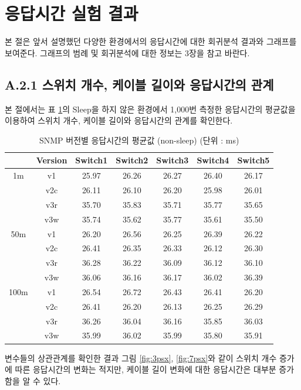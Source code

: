 \documentclass[11pt
  , a4paper
  , article
  , oneside
]{memoir}
\begin{document}
\clearpage
\section{응답시간 실험 결과}
본 절은 앞서 설명했던 다양한 환경에서의 응답시간에 대한 회귀분석 결과와 그래프를 보여준다. 그래프의 범례 및 회귀분석에 대한 정보는 3장을 참고 바란다.

\subsection{A.2.1 스위치 개수, 케이블 길이와 응답시간의 관계}


본 절에서는 표 \ref{table:sx}의 Sleep을 하지 않은 환경에서 1,000번 측정한 응답시간의 평균값을 이용하여 스위치 개수, 케이블 길이와 응답시간의 관계를 확인한다.

\begin{table}[!htb]
\begin{center}
\begin{tabular}{c|c|c|c|c|c|c}\hline
 & Version & Switch1 & Switch2 & Switch3 & Switch4 & Switch5\\ \hline
1m & v1 & 25.97 & 26.26 & 26.27 & 26.40& 26.17 \\ 
& v2c & 26.11 & 26.10 & 26.20 & 25.98 & 26.01 \\ 
& v3r & 35.70 & 35.83 & 35.71 & 35.77 & 35.65 \\ 
& v3w & 35.74 & 35.62 & 35.77 & 35.61 & 35.50 \\\hline
50m & v1 & 26.20 & 26.56 & 26.25 & 26.39 & 26.22 \\ 
& v2c & 26.41 & 26.35 & 26.33 & 26.12 & 26.30 \\ 
& v3r & 36.28 & 36.22 & 36.09 & 36.12 & 36.10 \\ 
& v3w & 36.06 & 36.16 & 36.17 & 36.02 & 36.39\\\hline
100m & v1 & 26.54 & 26.72 & 26.43 & 26.41 & 26.20 \\
& v2c & 26.41 & 26.20 & 26.13 & 26.25 & 26.29 \\
& v3r & 36.26 & 36.04 & 36.16 & 35.85 & 36.03 \\
& v3w & 35.99 & 36.02 & 35.99 & 35.80 & 35.91 \\\hline \hline
\end{tabular}
\caption{SNMP 버전별 응답시간의 평균값 (non-sleep) (단위 : ms)}
  \label{table:sx}  
\end{center}
\end{table} 

변수들의 상관관계를 확인한 결과 그림 \ref{fig:3psx}, \ref{fig:7psx}와 같이 스위치 개수 증가에 따른 응답시간의 변화는 적지만, 케이블 길이 변화에 대한 응답시간은 대부분 증가함을 알 수 있다.
\end{document}
